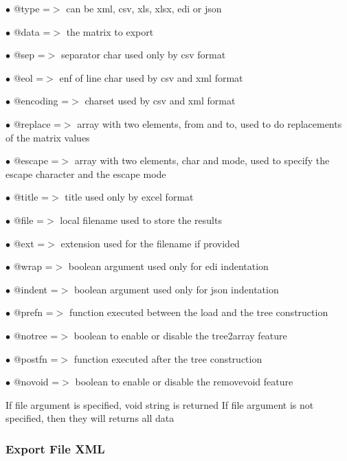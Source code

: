 \documentclass[a4paper]{article}
\begin{document}
\begin{compactitem}
\item[\color{myblue}$\bullet$] @type     =$>$ can be xml, csv, xls, xlsx, edi or json
\item[\color{myblue}$\bullet$] @data     =$>$ the matrix to export
\item[\color{myblue}$\bullet$] @sep      =$>$ separator char used only by csv format
\item[\color{myblue}$\bullet$] @eol      =$>$ enf of line char used by csv and xml format
\item[\color{myblue}$\bullet$] @encoding =$>$ charset used by csv and xml format
\item[\color{myblue}$\bullet$] @replace  =$>$ array with two elements, from and to, used to do replacements of the matrix values
\item[\color{myblue}$\bullet$] @escape   =$>$ array with two elements, char and mode, used to specify the escape character and the
             escape mode
\item[\color{myblue}$\bullet$] @title    =$>$ title used only by excel format
\item[\color{myblue}$\bullet$] @file     =$>$ local filename used to store the results
\item[\color{myblue}$\bullet$] @ext      =$>$ extension used for the filename if provided
\item[\color{myblue}$\bullet$] @wrap     =$>$ boolean argument used only for edi indentation
\item[\color{myblue}$\bullet$] @indent   =$>$ boolean argument used only for json indentation
\item[\color{myblue}$\bullet$] @prefn    =$>$ function executed between the load and the tree construction
\item[\color{myblue}$\bullet$] @notree   =$>$ boolean to enable or disable the tree2array feature
\item[\color{myblue}$\bullet$] @postfn   =$>$ function executed after the tree construction
\item[\color{myblue}$\bullet$] @novoid   =$>$ boolean to enable or disable the removevoid feature
\end{compactitem}

If file argument is specified, void string is returned
If file argument is not specified, then they will returns all data

\hypertarget{toc439}{}
\subsubsection{Export File XML}
\end{document}
